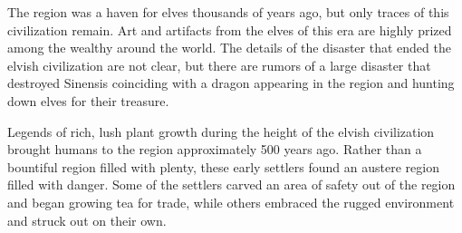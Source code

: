 The region was a haven for elves thousands of years ago, but only traces of this civilization remain.
Art and artifacts from the elves of this era are highly prized among the wealthy around the world.
The details of the disaster that ended the elvish civilization are not clear, but there are rumors of a large disaster that destroyed Sinensis coinciding with a dragon appearing in the region and hunting down elves for their treasure.

Legends of rich, lush plant growth during the height of the elvish civilization brought humans to the region approximately 500 years ago.
Rather than a bountiful region filled with plenty, these early settlers found an austere region filled with danger.
Some of the settlers carved an area of safety out of the region and began growing tea for trade, while others embraced the rugged environment and struck out on their own.
